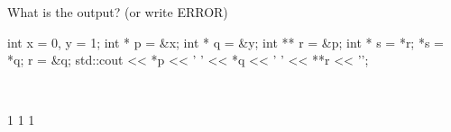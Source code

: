 \nextq
What is the output? (or write ERROR)
\begin{console}[fontsize=\small]
int x = 0, y = 1;
int * p = &x;
int * q = &y;
int ** r = &p;
int * s = *r;
*s = *q;
r = &q;
std::cout << *p << ' ' << *q << ' ' << **r << '\n';
\end{console}
\\ \ANSWER
\begin{answercode}
1 1 1
\end{answercode}


